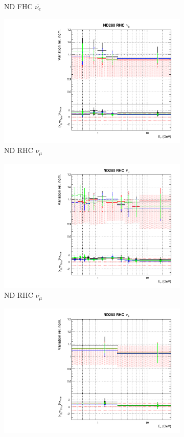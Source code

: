\begin{figure}[!htbp]
\begin{subfigure}{0.45\textwidth}
  \caption{ND FHC $\bar{\nu_{e}}$}
\end{subfigure}
\begin{subfigure}{0.45\textwidth}
  \centering
  \includegraphics[width=0.75\linewidth]{figs/detcovbinflux_4}
  \caption{ND RHC $\nu_{\mu}$}
\end{subfigure}
\begin{subfigure}{0.45\textwidth}
  \centering
  \includegraphics[width=0.75\linewidth]{figs/detcovbinflux_5}
  \caption{ND RHC $\bar{\nu_{\mu}}$}
\end{subfigure}
\begin{subfigure}{0.45\textwidth}
  \centering
  \includegraphics[width=0.75\linewidth]{figs/detcovbinflux_6}

\end{subfigure}
\end{figure}
